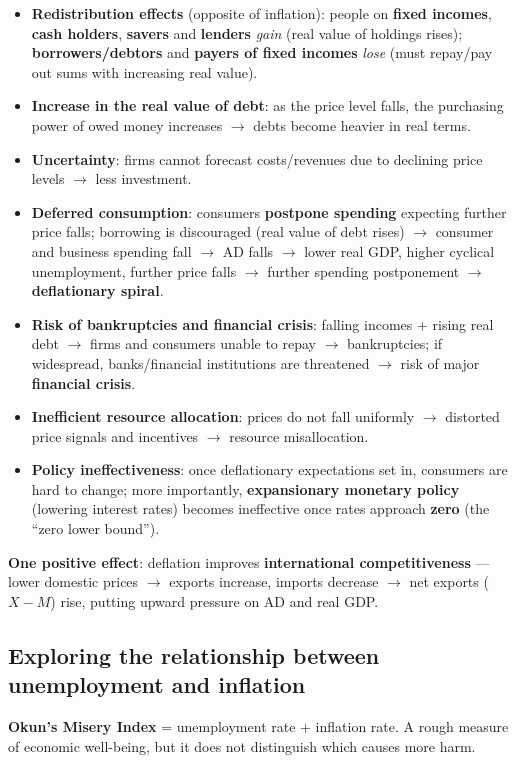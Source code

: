 \documentclass[a4paper,12pt]{article}
\begin{document}
\begin{itemize}
  \item \textbf{Redistribution effects} (opposite of inflation): people on \textbf{fixed incomes}, \textbf{cash holders}, \textbf{savers} and \textbf{lenders} \textit{gain} (real value of holdings rises); \textbf{borrowers/debtors} and \textbf{payers of fixed incomes} \textit{lose} (must repay/pay out sums with increasing real value).
  \item \textbf{Increase in the real value of debt}: as the price level falls, the purchasing power of owed money increases $\to$ debts become heavier in real terms.
  \item \textbf{Uncertainty}: firms cannot forecast costs/revenues due to declining price levels $\to$ less investment.
  \item \textbf{Deferred consumption}: consumers \textbf{postpone spending} expecting further price falls; borrowing is discouraged (real value of debt rises) $\to$ consumer and business spending fall $\to$ AD falls $\to$ lower real GDP, higher cyclical unemployment, further price falls $\to$ further spending postponement $\to$ \textbf{deflationary spiral}.
  \item \textbf{Risk of bankruptcies and financial crisis}: falling incomes + rising real debt $\to$ firms and consumers unable to repay $\to$ bankruptcies; if widespread, banks/financial institutions are threatened $\to$ risk of major \textbf{financial crisis}.
  \item \textbf{Inefficient resource allocation}: prices do not fall uniformly $\to$ distorted price signals and incentives $\to$ resource misallocation.
  \item \textbf{Policy ineffectiveness}: once deflationary expectations set in, consumers are hard to change; more importantly, \textbf{expansionary monetary policy} (lowering interest rates) becomes ineffective once rates approach \textbf{zero} (the ``zero lower bound'').
\end{itemize}
\textbf{One positive effect}: deflation improves \textbf{international competitiveness} --- lower domestic prices $\to$ exports increase, imports decrease $\to$ net exports ($X - M$) rise, putting upward pressure on AD and real GDP. 
\subsection{Exploring the relationship between unemployment and inflation}
\textbf{Okun's Misery Index} = unemployment rate + inflation rate. A rough measure of economic well-being, but it does not distinguish which causes more harm.\\\\
\end{document}
